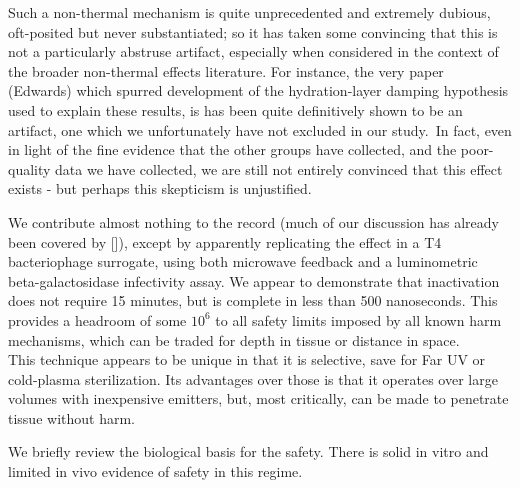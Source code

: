 \documentclass[paper.tex]{subfiles}
\begin{document}
Such a non-thermal mechanism is quite unprecedented and extremely dubious, oft-posited but never substantiated; so it has taken some convincing that this is not a particularly abstruse artifact, especially when considered in the context of the broader non-thermal effects literature. For instance, the very paper (Edwards) which spurred development of the hydration-layer damping hypothesis used to explain these results, is has been quite\cite{Resonances1987} definitively\cite{Microwave1993a} shown to be an artifact, one which we unfortunately have not excluded in our study.\footnotemark \ In fact, even in light of the fine evidence that the other groups have collected, and the poor-quality data we have collected, we are still not entirely convinced that this effect exists - but perhaps this skepticism is unjustified.\\


We contribute almost nothing to the record (much of our discussion has already been covered by []), except by apparently replicating the effect in a T4 bacteriophage surrogate, using both microwave feedback and a luminometric beta-galactosidase infectivity assay. We appear to demonstrate that inactivation does not require 15 minutes, but is complete in less than 500 nanoseconds. This provides a headroom of some $10^6$ to all safety limits imposed by all known harm mechanisms, which can be traded for depth in tissue or distance in space. \\

This technique appears to be unique in that it is selective, save for Far UV or cold-plasma sterilization. Its advantages over those is that it operates over large volumes with inexpensive emitters, but, most critically, can be made to penetrate tissue without harm.

We briefly review the biological basis for the safety. There is solid in vitro and limited in vivo evidence of safety in this regime.

\end{document}
